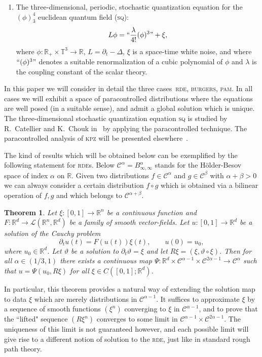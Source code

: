 \documentclass[11pt,a4paper]{article}
\newtheorem{theorem}{Theorem}[section]
\theoremstyle{remark}
\newcommand{\R}{\mathbb{R}}
\newcommand{\CC}{\ensuremath{\mathscr{C}}}
\begin{document}
\begin{enumerate}
  \item The three-dimensional, periodic,  stochastic quantization equation for the $(\phi)^4_3$ euclidean quantum field (\textsc{sq}):
  \[
   L \phi = ``\frac{\lambda}{4!} (\phi)^3" + \xi,
  \]
    where $\phi \colon \R_+ \times \mathbb{T}^3 \rightarrow \R$, $L = \partial_t - \Delta$, $\xi$ is a space-time white noise, and where $``(\phi)^3"$ denotes a suitable renormalization of a cubic polynomial of $\phi$ and $\lambda$ is the coupling constant of the scalar theory.
  
\end{enumerate}

In this paper we will consider in detail the three cases~\textsc{rde}, \textsc{burgers}, \textsc{pam}. In all cases we will exhibit a space of paracontrolled distributions where the equations are well posed (in a suitable sense), and admit a global solution which is unique.
%
The three-dimensional stochastic quantization equation \textsc{sq} is studied by R.~Catellier and K.~Chouk in~\cite{Catellier2013} by applying the paracontrolled technique. The paracontrolled analysis of \textsc{kpz}  will be presented elsewhere~\cite{Gubinelli-KPZ-2013}.


\bigskip

The kind of results which will be obtained below can be exemplified by the following statement for \textsc{rde}s. Below $\CC^\alpha = B^\alpha_{\infty, \infty}$ stands for the H\"older-Besov space of index $\alpha$ on $\mathbb{R}$. Given two distributions $f\in \CC^\alpha$ and $g\in \CC^\beta$ with $\alpha+\beta >0$ we can always consider a certain distribution $f \circ g$ which is obtained via a bilinear operation of $f,g$ and which belongs to $\CC^{\alpha+\beta}$.
\begin{theorem}
Let $\xi:[0,1]\to \mathbb{R}^n$ be a continuous function and $F:\mathbb{R}^d\to \mathcal{L}(\mathbb{R}^n, \mathbb{R}^d)$ be a family of  smooth vector-fields. Let $u:[0,1]\to \mathbb{R}^d$ be a 
 solution of the Cauchy problem
\[
\partial_t u(t) = F(u(t)) \xi(t),\qquad
u(0)=u_0,
\]
where $u_0 \in \R^d$. Let $\vartheta$ be a solution to $\partial_t \vartheta = \xi$ and let $R\xi=(\xi,\vartheta\circ \xi)$. Then for all $\alpha \in (1/3,1)$ there exists a continuous map $\Psi:\mathbb{R}^d\times\CC^{\alpha-1}\times\CC^{2\alpha-1}\to \CC^{\alpha}$ such that $u=\Psi(u_0,R\xi)$ for all $\xi\in C([0,1];\mathbb{R}^d)$.
\end{theorem}

In particular, this theorem provides a natural way of extending the solution map to data $\xi$ which are merely distributions in $\CC^{\alpha-1}$. It suffices to approximate $\xi$ by a sequence of smooth functions $(\xi^n)$ converging to $\xi$ in $\CC^{\alpha-1}$, and to prove that the ``lifted" sequence $(R\xi^n)$ converges to some limit in $ \CC^{\alpha-1}\times\CC^{2\alpha-1}$. The uniqueness of this limit is not guaranteed however, and each possible limit will give rise to a different notion of solution to the \textsc{rde}, just like in standard rough path theory. 
\end{document}
